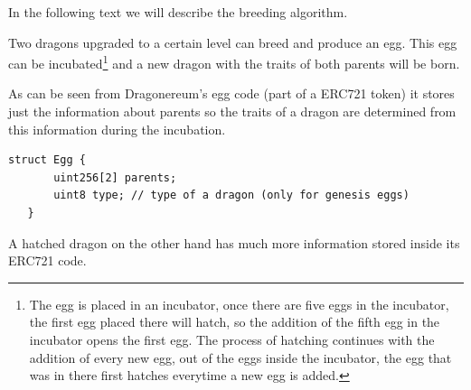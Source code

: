 \documentclass[12pt]{article}
\begin{document}
In the following text we will describe the breeding algorithm.\par

Two dragons upgraded to a certain level can breed and produce an egg. This egg can be incubated\footnote{The egg is placed in an incubator, once there are five eggs in the incubator, the first egg placed there will hatch, so the addition of the fifth egg in the incubator opens the first egg. The process of hatching continues with the addition of every new egg, out of the eggs inside the incubator, the egg that was in there first hatches everytime a new egg is added.}  and a new dragon with the traits of both parents will be born.\par

As can be seen from Dragonereum’s egg code (part of a ERC721 token) it stores just the information about parents so the traits of a dragon are determined from this information during the incubation.\par



\begin{footnotesize}
\begin{verbatim}
struct Egg {
       uint256[2] parents;
       uint8 type; // type of a dragon (only for genesis eggs)
   }

\end{verbatim}
\end{footnotesize}

A hatched dragon on the other hand has much more information stored inside its ERC721 code.\par
\end{document}
